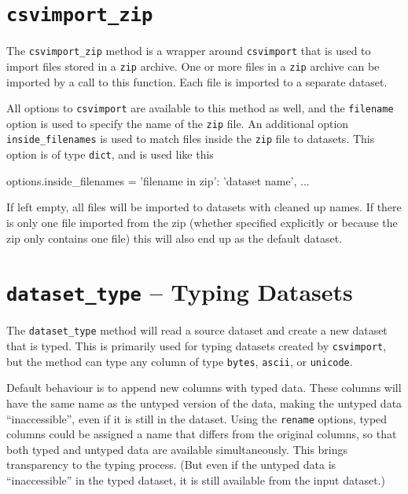 




\clearpage
\section{\texttt{csvimport\_zip}}
The \texttt{csvimport\_zip} method is a wrapper
around \texttt{csvimport} that is used to import files stored in
a \texttt{zip} archive.  One or more files in a \texttt{zip} archive
can be imported by a call to this function.  Each file is imported to
a separate dataset.

All options to \texttt{csvimport} are available to this method as
well, and the \texttt{filename} option is used to specify the name of
the \texttt{zip} file.  An additional option \texttt{inside\_filenames}
is used to match files inside the \texttt{zip} file to datasets.
This option is of type \texttt{dict}, and is used like this
\begin{python}
 options.inside_filenames = {'filename in zip': 'dataset name', ...}
\end{python}
If left empty, all files will be imported to datasets with cleaned up
names.  If there is only one file imported from the zip (whether
specified explicitly or because the zip only contains one file) this
will also end up as the default dataset.






\clearpage
\section{\texttt{dataset\_type} -- Typing Datasets}
The \texttt{dataset\_type} method will read a source dataset and
create a new dataset that is typed.  This is primarily used for typing
datasets created by \texttt{csvimport}, but the method can type any
column of type \texttt{bytes}, \texttt{ascii}, or \texttt{unicode}.

Default behaviour is to append new columns with typed data.  These
columns will have the same name as the untyped version of the data,
making the untyped data ``inaccessible'', even if it is still in the
dataset.  Using the \texttt{rename} options, typed columns could be
assigned a name that differs from the original columns, so that both
typed and untyped data are available simultaneously.  This brings
transparency to the typing process.  (But even if the untyped data is
``inaccessible'' in the typed dataset, it is still available from the
input dataset.)

